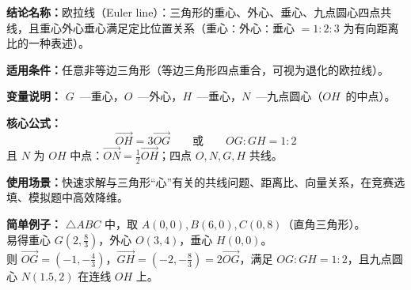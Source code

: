 \textbf{结论名称：}欧拉线（Euler line）：三角形的重心、外心、垂心、九点圆心四点共线，且重心外心垂心满足定比位置关系（重心∶外心∶垂心 $=1:2:3$ 为有向距离比的一种表述）。

\textbf{适用条件：}任意非等边三角形（等边三角形四点重合，可视为退化的欧拉线）。

\textbf{变量说明：} $G$~---重心，$O$~---外心，$H$~---垂心，$N$~---九点圆心（$OH$~的中点）。

\textbf{核心公式：}
\[
\boxed{\overrightarrow{OH}=3\overrightarrow{OG}}\qquad\text{或}\qquad\boxed{OG:GH=1:2}
\]
且 $N$ 为 $OH$ 中点：$\displaystyle \overrightarrow{ON}=\frac{1}{2}\overrightarrow{OH}$；四点 $O,N,G,H$ 共线。

\textbf{使用场景：}快速求解与三角形“心”有关的共线问题、距离比、向量关系，在竞赛选填、模拟题中高效降维。

\textbf{简单例子：} $\triangle ABC$ 中，取 $A(0,0),B(6,0),C(0,8)$（直角三角形）。\\
易得重心 $G(2,\frac{8}{3})$，外心 $O(3,4)$，垂心 $H(0,0)$。\\
则 $\overrightarrow{OG}=(-1,-\frac{4}{3})$，$\overrightarrow{GH}=(-2,-\frac{8}{3})=2\overrightarrow{OG}$，满足 $OG:GH=1:2$，且九点圆心 $N(1.5,2)$ 在连线 $OH$ 上。